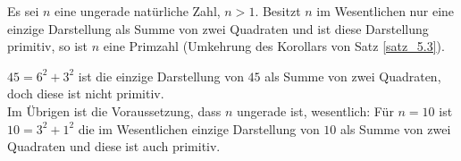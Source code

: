 	Es sei $n$  eine ungerade natürliche Zahl, $n > 1$. Besitzt $n$ im Wesentlichen nur eine einzige Darstellung als Summe von zwei Quadraten und ist diese Darstellung primitiv, so ist $n$ eine Primzahl (Umkehrung des Korollars von Satz \ref{satz_5.3}).
	
	$45 = 6^2 + 3^2$ ist die einzige Darstellung von $45$ als Summe von zwei Quadraten, doch diese ist nicht primitiv. \\
	Im Übrigen ist die Voraussetzung, dass $n$ ungerade ist, wesentlich: Für $n = 10$ ist $10 = 3^2 + 1^2$ die im Wesentlichen einzige Darstellung von $10$ als Summe von zwei Quadraten und diese ist auch primitiv.
\newpage